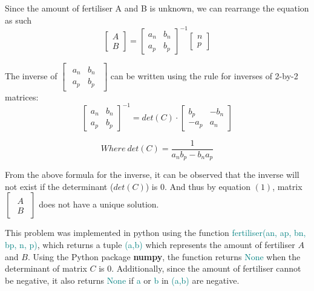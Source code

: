 \documentclass[a4paper]{article}
\newcommand \fertiliser {\textcolor{teal}{fertiliser(an, ap, bn, bp, n, p)}}
\begin{document}
\noindent
Since the amount of fertiliser A and B is unknown, we can rearrange the equation as such
\begin{equation}
    \begin{bmatrix} A \\ B \end{bmatrix} =
    \begin{bmatrix} a_n & b_n \\ a_p & b_p \end{bmatrix}^{-1}
    \begin{bmatrix} n \\p \end{bmatrix}
\end{equation}


\noindent
The inverse of $\begin{bmatrix}\begin{smallmatrix}a_n & b_n \\ a_p & b_p  \end{smallmatrix}\end{bmatrix}$ can be written using the rule for inverses of 2-by-2 matrices:
\begin{equation*}
    \begin{bmatrix} a_n & b_n \\ a_p & b_p \end{bmatrix}^{-1} =
    det(C)\cdot \begin{bmatrix} b_p & -b_n \\ -a_p & a_n \end{bmatrix}
\end{equation*}

\begin{flushright}
    \begin{equation*}
        Where \ det(C) = \frac{1}{a_n b_p - b_n a_p} 
    \end{equation*}
\end{flushright}

\noindent
From the above formula for the inverse, it can be observed that the inverse will not exist if the determinant ($det(C)$) is $0$. And thus by equation $(1)$, matrix $\begin{bmatrix}\begin{smallmatrix} A \\ B \end{smallmatrix}\end{bmatrix}$ does not have a unique solution. 
\vspace{2mm}

\noindent
This problem was implemented in python using the function \fertiliser, which returns a tuple \textcolor{teal}{(a,b)} which represents the amount of fertiliser $A$ and $B$. Using the Python package \textbf{numpy}, the function returns \textcolor{teal}{None} when the determinant of matrix $C$ is $0$. Additionally, since the amount of fertiliser cannot be negative, it also returns \textcolor{teal}{None} if \textcolor{teal}{a} or \textcolor{teal}{b} in \textcolor{teal}{(a,b)} are negative.

\printbibliography
\end{document}
